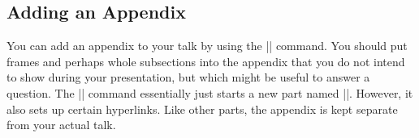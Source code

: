 \subsection{Adding an Appendix}

You can add an appendix to your talk by using the |\appendix|
command. You should put frames and perhaps whole subsections into the
appendix that you do not intend to show during your presentation, but
which might be useful to answer a question. The |\appendix| command
essentially just starts a new part named |\appendixname|. However, it
also sets up certain hyperlinks.
Like other parts, the appendix is kept separate from your actual
talk.





